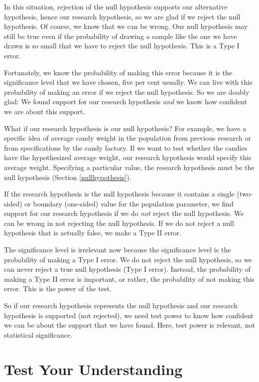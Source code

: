 \documentclass[a4paper]{book}
\theoremstyle{definition}
\theoremstyle{definition}
\theoremstyle{definition}
\theoremstyle{remark}
\begin{document}
In this situation, rejection of the null hypothesis supports our
alternative hypothesis, hence our research hypothesis, so we are glad if
we reject the null hypothesis. Of course, we know that we can be wrong.
Our null hypothesis may still be true even if the probability of drawing
a sample like the one we have drawn is so small that we have to reject
the null hypothesis. This is a Type I error.

Fortunately, we know the probability of making this error because it is
the significance level that we have chosen, five per cent usually. We
can live with this probability of making an error if we reject the null
hypothesis. So we are doubly glad: We found support for our research
hypothesis \emph{and} we know how confident we are about this support.

What if our research hypothesis is our null hypothesis? For example, we
have a specific idea of average candy weight in the population from
previous research or from specifications by the candy factory. If we
want to test whether the candies have the hypothesized average weight,
our research hypothesis would specify this average weight. Specifying a
particular value, the research hypothesis must be the null hypothesis
(Section \ref{nullhypothesis}).

If the research hypothesis is the null hypothesis because it contains a
single (two-sided) or boundary (one-sided) value for the population
parameter, we find support for our research hypothesis if we do
\emph{not} reject the null hypothesis. We can be wrong in not rejecting
the null hypothesis. If we do not reject a null hypothesis that is
actually false, we make a Type II error.

The significance level is irrelevant now because the significance level
is the probability of making a Type I error. We do not reject the null
hypothesis, so we can never reject a true null hypothesis (Type I
error). Instead, the probability of making a Type II error is important,
or rather, the probability of not making this error. This is the power
of the test.

So if our research hypothesis represents the null hypothesis and our
research hypothesis is supported (not rejected), we need test power to
know how confident we can be about the support that we have found. Here,
test power is relevant, not statistical significance.

\section{Test Your Understanding}\label{test-your-understanding-4}
\end{document}
